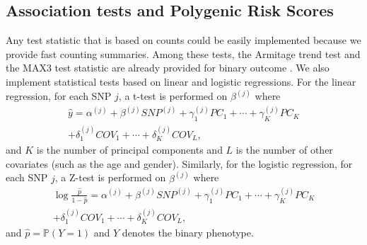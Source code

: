 \documentclass{bioinfo}
\begin{document}
\begin{methods}
\subsection{Association tests and Polygenic Risk Scores}

Any test statistic that is based on counts could be easily implemented because we provide fast counting summaries. Among these tests, the Armitage trend test and the MAX3 test statistic are already provided for binary outcome \cite[]{Zheng2012}. 
We also implement statistical tests based on linear and logistic regressions. For the linear regression, for each SNP $j$, a t-test is performed on $\beta^{(j)}$ where
\begin{multline}
  \hat{y} = \alpha^{(j)} + \beta^{(j)} SNP^{(j)} + \gamma_1^{(j)} PC_1 + \cdots + \gamma_K^{(j)} PC_K \\ + \delta_1^{(j)} COV_1 + \cdots + \delta_K^{(j)} COV_L,
\end{multline}
and $K$ is the number of principal components and $L$ is the number of other covariates (such as the age and gender). Similarly, for the logistic regression, for each SNP $j$, a Z-test is performed on $\beta^{(j)}$ where
\begin{multline}
  \log{\frac{\hat{p}}{1-\hat{p}}} = \alpha^{(j)} + \beta^{(j)} SNP^{(j)} + \gamma_1^{(j)} PC_1 + \cdots + \gamma_K^{(j)} PC_K \\ + \delta_1^{(j)} COV_1 + \cdots + \delta_K^{(j)} COV_L,
\end{multline}
and $\hat{p} = \mathbb{P}(Y = 1)$ and $Y$ denotes the binary phenotype.


\end{methods}
\end{document}
